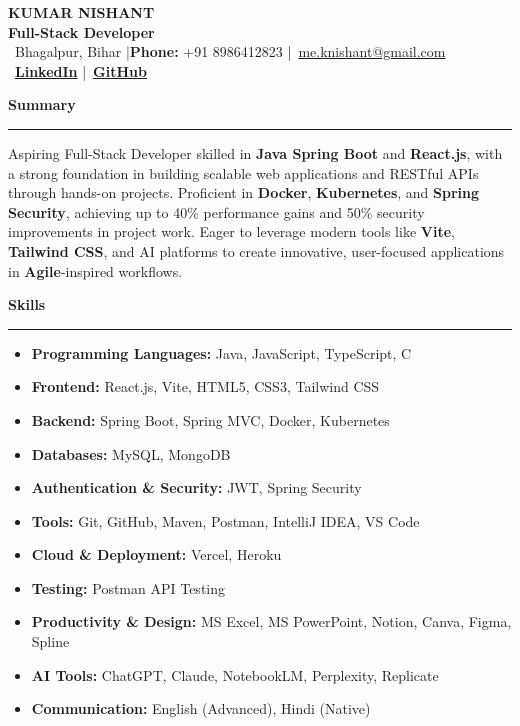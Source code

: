 \documentclass[11pt,a4paper]{article}
\newcommand{\sectionheading}[1]{%
    \vspace{0.5em}%
    {\large\headingfont\color{primary}\textbf{#1}}%
    \vspace{0.25em}%
    \hrule%
    \vspace{0.5em}%
}
\newenvironment{cvitemize}{%
    \begin{itemize}[leftmargin=1.5em, nosep, noitemsep]
}{%
    \end{itemize}
}
\begin{document}
\begin{center}
    {\Huge\headingfont\color{primary}\textbf{KUMAR NISHANT}}\\[0.5em]
    {\large\color{secondary}\textbf{Full-Stack Developer}}\\[0.5em]
    {\small \faMapMarker\ Bhagalpur, Bihar \quad |\quad \textbf{Phone:} +91 8986412823 \quad |\quad \faEnvelope\ \href{mailto:me.knishant@gmail.com}{me.knishant@gmail.com}}\\[0.25em]
    {\small \faLinkedin\ \href{https://www.linkedin.com/in/kumar-nishant-dev/}{\textbf{LinkedIn}} \quad |\quad \faGithub\ \href{https://github.com/K-Nishant-18}{\textbf{GitHub}}}
\end{center}

\sectionheading{Summary}
\noindent Aspiring Full-Stack Developer skilled in \textbf{Java Spring Boot} and \textbf{React.js}, with a strong foundation in building scalable web applications and RESTful APIs through hands-on projects. Proficient in \textbf{Docker}, \textbf{Kubernetes}, and \textbf{Spring Security}, achieving up to 40\% performance gains and 50\% security improvements in project work. Eager to leverage modern tools like \textbf{Vite}, \textbf{Tailwind CSS}, and AI platforms to create innovative, user-focused applications in \textbf{Agile}-inspired workflows.

\sectionheading{Skills}
\begin{cvitemize}
    \item \textbf{Programming Languages:} Java, JavaScript, TypeScript, C
    \item \textbf{Frontend:} React.js, Vite, HTML5, CSS3, Tailwind CSS
    \item \textbf{Backend:} Spring Boot, Spring MVC, Docker, Kubernetes
    \item \textbf{Databases:} MySQL, MongoDB
    \item \textbf{Authentication \& Security:} JWT, Spring Security
    \item \textbf{Tools:} Git, GitHub, Maven, Postman, IntelliJ IDEA, VS Code
    \item \textbf{Cloud \& Deployment:} Vercel, Heroku
    \item \textbf{Testing:} Postman API Testing
    \item \textbf{Productivity \& Design:} MS Excel, MS PowerPoint, Notion, Canva, Figma, Spline
    \item \textbf{AI Tools:} ChatGPT, Claude, NotebookLM, Perplexity, Replicate
    \item \textbf{Communication:} English (Advanced), Hindi (Native)
\end{cvitemize}
\end{document}
